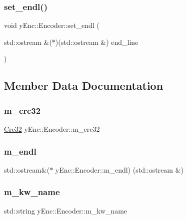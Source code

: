 \subsubsection{\texorpdfstring{set\+\_\+endl()}{set\_endl()}}
{\footnotesize\ttfamily void y\+Enc\+::\+Encoder\+::set\+\_\+endl (\begin{DoxyParamCaption}\item[{std\+::ostream \&($\ast$)(std\+::ostream \&)}]{end\+\_\+line }\end{DoxyParamCaption})}



\subsection{Member Data Documentation}
\hypertarget{classy_enc_1_1_encoder_a37dfb1af4fb772ffc127253a2362a30f}{}\label{classy_enc_1_1_encoder_a37dfb1af4fb772ffc127253a2362a30f} 
\subsubsection{\texorpdfstring{m\+\_\+crc32}{m\_crc32}}
{\footnotesize\ttfamily \hyperlink{class_crc32}{Crc32} y\+Enc\+::\+Encoder\+::m\+\_\+crc32\hspace{0.3cm}{\ttfamily [protected]}}

\hypertarget{classy_enc_1_1_encoder_ad4b12df574cfbcc49be6ff1308bf8d77}{}\label{classy_enc_1_1_encoder_ad4b12df574cfbcc49be6ff1308bf8d77} 
\subsubsection{\texorpdfstring{m\+\_\+endl}{m\_endl}}
{\footnotesize\ttfamily std\+::ostream\&($\ast$ y\+Enc\+::\+Encoder\+::m\+\_\+endl) (std\+::ostream \&)\hspace{0.3cm}{\ttfamily [protected]}}

\hypertarget{classy_enc_1_1_encoder_a99adeef35b508ce81611656a8ea03973}{}\label{classy_enc_1_1_encoder_a99adeef35b508ce81611656a8ea03973} 
\subsubsection{\texorpdfstring{m\+\_\+kw\+\_\+name}{m\_kw\_name}}
{\footnotesize\ttfamily std\+::string y\+Enc\+::\+Encoder\+::m\+\_\+kw\+\_\+name\hspace{0.3cm}{\ttfamily [protected]}}

